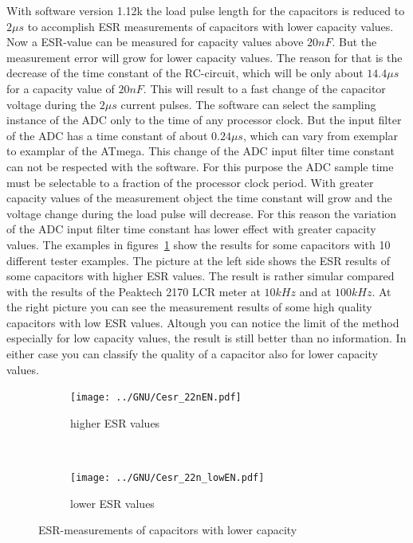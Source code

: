 With software version 1.12k the load pulse length for the capacitors is reduced to \(2\mu s\) to accomplish ESR measurements
of capacitors with lower capacity values. Now a ESR-value can be measured for capacity values above \(20nF\).
But the measurement error will grow for lower capacity values. The reason for that is the decrease of the time constant of the
RC-circuit, which will be only about \(14.4\mu s\) for a capacity value of \(20nF\).
This will result to a fast change of the capacitor voltage during the \(2\mu s\) current pulses.
The software can select the sampling instance of the ADC only to the time of any processor clock.
But the input filter of the ADC has a time constant of about \(0.24\mu s\), which can vary from exemplar to examplar of the ATmega.
This change of the ADC input filter time constant can not be respected with the software.
For this purpose the ADC sample time must be selectable to a fraction of the processor clock period.
With greater capacity values of the measurement object the time constant will grow and the voltage change during the
load pulse will decrease. For this reason the variation of the ADC input filter time constant  has
lower effect with greater capacity values.
The examples in figures~\ref{pic:Cesr_22n} show the results for some capacitors with 10 different tester examples. The picture at the left side
shows the ESR results of some capacitors with higher ESR values. The result is rather simular compared with the results
of the Peaktech 2170 LCR meter at \(10kHz\) and at \(100kHz\).
At the right picture you can see the measurement results of some high quality capacitors with low ESR values.
Altough you can notice the limit of the method especially for low capacity values, the result is still better than no information.
In either case you can classify the quality of a capacitor also for lower capacity values.

\begin{figure}[H]
  \begin{subfigure}[b]{.5\textwidth}
    \centering
    \texttt{[image: ../GNU/Cesr\_22nEN.pdf]}
    \caption{higher ESR values}
  \end{subfigure}
  ~
  \begin{subfigure}[b]{.5\textwidth}
    \centering
    \texttt{[image: ../GNU/Cesr\_22n\_lowEN.pdf]}
    \caption{lower ESR values}
  \end{subfigure}
  \caption{ESR-measurements of capacitors with lower capacity}
  \label{pic:Cesr_22n}
\end{figure}
 
